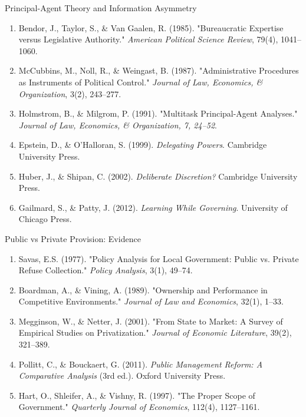 \documentclass[10pt]{beamer}
\begin{document}
\begin{frame}{Principal-Agent Theory and Information Asymmetry}
\footnotesize
\begin{enumerate}
\item Bendor, J., Taylor, S., \& Van Gaalen, R. (1985). "Bureaucratic Expertise versus Legislative Authority." \emph{American Political Science Review}, 79(4), 1041–1060.
\item McCubbins, M., Noll, R., \& Weingast, B. (1987). "Administrative Procedures as Instruments of Political Control." \emph{Journal of Law, Economics, \& Organization}, 3(2), 243–277.
\item Holmstrom, B., \& Milgrom, P. (1991). "Multitask Principal-Agent Analyses." \emph{Journal of Law, Economics, \& Organization, 7, 24–52}.
\item Epstein, D., \& O'Halloran, S. (1999). \emph{Delegating Powers}. Cambridge University Press.
\item Huber, J., \& Shipan, C. (2002). \emph{Deliberate Discretion?} Cambridge University Press.
\item Gailmard, S., \& Patty, J. (2012). \emph{Learning While Governing}. University of Chicago Press.
\end{enumerate}
\end{frame}

\begin{frame}{Public vs Private Provision: Evidence}
\footnotesize
\begin{enumerate}
\item Savas, E.S. (1977). "Policy Analysis for Local Government: Public vs. Private Refuse Collection." \emph{Policy Analysis}, 3(1), 49–74.
\item Boardman, A., \& Vining, A. (1989). "Ownership and Performance in Competitive Environments." \emph{Journal of Law and Economics}, 32(1), 1–33.
\item Megginson, W., \& Netter, J. (2001). "From State to Market: A Survey of Empirical Studies on Privatization." \emph{Journal of Economic Literature}, 39(2), 321–389.
\item Pollitt, C., \& Bouckaert, G. (2011). \emph{Public Management Reform: A Comparative Analysis} (3rd ed.). Oxford University Press.
\item Hart, O., Shleifer, A., \& Vishny, R. (1997). "The Proper Scope of Government." \emph{Quarterly Journal of Economics}, 112(4), 1127–1161.
\end{enumerate}
\end{frame}
\end{document}
